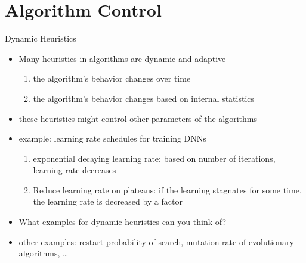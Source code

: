 \section{Algorithm Control}
\begin{frame}[c]{Dynamic Heuristics}

\begin{itemize}
	\item Many heuristics in algorithms are dynamic and adaptive
	\begin{enumerate}
		\item the algorithm's behavior changes over time
		\item the algorithm's behavior changes based on internal statistics
	\end{enumerate}
	\medskip
	\item these heuristics might control other parameters of the algorithms
	\pause
	\smallskip
	\item example: learning rate schedules for training DNNs
	\begin{enumerate}
		\item exponential decaying learning rate: based on number of iterations, learning rate decreases
		\pause
		\item Reduce learning rate on plateaus: if the learning stagnates for some time, the learning rate is decreased by a factor
	\end{enumerate}
	\pause
	\item What examples for dynamic heuristics can you think of? \hands
	\pause
	\item other examples: restart probability of search, mutation rate of evolutionary algorithms, \ldots  
	
\end{itemize}

\end{frame}
